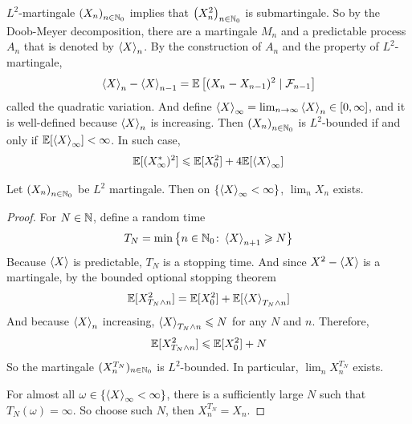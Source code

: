 \documentclass[a4paper,12pt]{article}
\begin{document}
\begin{itemize}
  \noindent $L^2$-martingale $\left(X_n\right)_{n\in \mathbb{N}_0}$ implies that $\left(X_n^2\right)_{n\in \mathbb{N}_0}$ is submartingale. So by the Doob-Meyer decomposition, there are a martingale $M_n$ and a predictable process $A_n$ that is denoted by $\left\langle X \right\rangle_n$. By the construction of $A_n$ and the property of $L^2$-martingale,
  \begin{equation*}
    \left\langle X \right\rangle_n - \left\langle X \right\rangle_{n-1} = \mathbb{E}\left[(X_n-X_{n-1})^2 \mid \mathcal{F}_{n-1}\right]
  \end{equation*}
  called the quadratic variation. And define $\left\langle X \right\rangle_{\infty} = \lim_{n\rightarrow \infty}\left\langle X \right\rangle_n \in [0,\infty]$, and it is well-defined because $\left\langle X \right\rangle_n$ is increasing. Then $\left(X_n\right)_{n\in \mathbb{N}_0}$ is $L^2$-bounded if and only if $\mathbb{E}[\left\langle X \right\rangle_{\infty}] < \infty$. In such case,
  \begin{equation*}
    \mathbb{E}[(X_{\infty}^*)^2] \leqslant \mathbb{E}[X_0^2] + 4\mathbb{E}[\left\langle X \right\rangle_{\infty}]
  \end{equation*}

  \begin{prop}
    Let $\left(X_n\right)_{n\in \mathbb{N}_0}$ be $L^2$ martingale. Then on $\left\{\left\langle X \right\rangle_{\infty} < \infty\right\}$, $\lim_n X_n$ exists.
  \end{prop}
  \begin{proof}
    For $N \in \mathbb{N}$, define a random time
    \begin{equation*}
      T_N = \min\left\{n \in \mathbb{N}_0\colon \left\langle X \right\rangle_{n+1} \geqslant N\right\}
    \end{equation*}
    Because $\left\langle X \right\rangle$ is predictable, $T_N$ is a stopping time. And since $X^2-\left\langle X \right\rangle$ is a martingale, by the bounded optional stopping theorem
    \begin{equation*}
      \mathbb{E}[X^2_{T_N \wedge n}] = \mathbb{E}[X_0^2] + \mathbb{E}[\left\langle X \right\rangle_{T_N \wedge n}]
    \end{equation*}
    And because $\left\langle X \right\rangle_n$ increasing, $\left\langle X \right\rangle_{T_N \wedge n} \leqslant N$ for any $N$ and $n$. Therefore,
    \begin{equation*}
      \mathbb{E}[X^2_{T_N \wedge n}] \leqslant \mathbb{E}[X_0^2] + N
    \end{equation*}
    So the martingale $(X^{T_N}_n)_{n\in \mathbb{N}_0}$ is $L^2$-bounded. In particular, $\lim_nX^{T_N}_n$ exists.

    For almost all $\omega \in \left\{\left\langle X \right\rangle_{\infty} < \infty\right\}$, there is a sufficiently large $N$ such that $T_N(\omega) = \infty$. So choose such $N$, then $X^{T_N}_n =X_n$.
  \end{proof}
\end{itemize}
\end{document}

